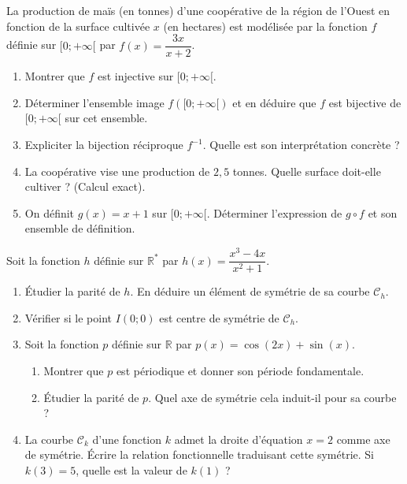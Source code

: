 \documentclass[11pt]{article}
\begin{document}
\begin{exercice}
La production de maïs (en tonnes) d'une coopérative de la région de l'Ouest en fonction de la surface cultivée $x$ (en hectares) est modélisée par la fonction $f$ définie sur $[0 ; +\infty[$ par $f(x) = \dfrac{3x}{x+2}$.
\begin{enumerate}
    \item Montrer que $f$ est injective sur $[0 ; +\infty[$.
    \item Déterminer l'ensemble image $f([0 ; +\infty[)$ et en déduire que $f$ est bijective de $[0 ; +\infty[$ sur cet ensemble.
    \item Expliciter la bijection réciproque $f^{-1}$. Quelle est son interprétation concrète ?
    \item La coopérative vise une production de $2,5$ tonnes. Quelle surface doit-elle cultiver ? (Calcul exact).
    \item On définit $g(x) = x + 1$ sur $[0 ; +\infty[$. Déterminer l'expression de $g \circ f$ et son ensemble de définition.
\end{enumerate}
\end{exercice}

\begin{exercice}
Soit la fonction $h$ définie sur $\mathbb{R}^*$ par $h(x) = \dfrac{x^3 - 4x}{x^2 + 1}$.
\begin{enumerate}
    \item Étudier la parité de $h$. En déduire un élément de symétrie de sa courbe $\mathcal{C}_h$.
    \item Vérifier si le point $I(0;0)$ est centre de symétrie de $\mathcal{C}_h$.
    \item Soit la fonction $p$ définie sur $\mathbb{R}$ par $p(x) = \cos(2x) + \sin(x)$.
    \begin{enumerate}
        \item Montrer que $p$ est périodique et donner son période fondamentale.
        \item Étudier la parité de $p$. Quel axe de symétrie cela induit-il pour sa courbe ?
    \end{enumerate}
    \item La courbe $\mathcal{C}_k$ d'une fonction $k$ admet la droite d'équation $x = 2$ comme axe de symétrie. Écrire la relation fonctionnelle traduisant cette symétrie. Si $k(3) = 5$, quelle est la valeur de $k(1)$ ?
\end{enumerate}
\end{exercice}
\end{document}
